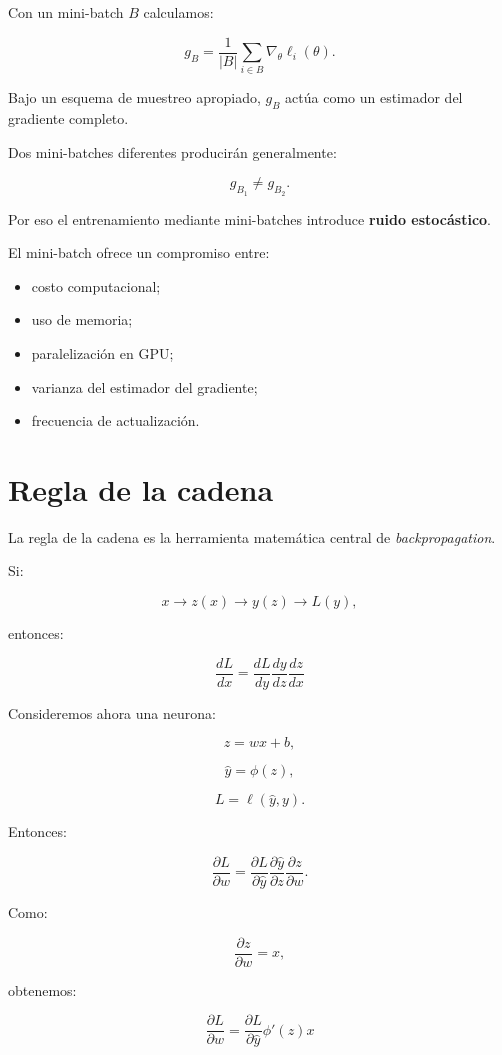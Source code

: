 \documentclass[
  letterpaper,
  DIV=11,
  numbers=noendperiod]{scrartcl}
\providecommand{\tightlist}{%
  \setlength{\itemsep}{0pt}\setlength{\parskip}{0pt}}
\begin{document}
Con un mini-batch \(B\) calculamos:

\[
g_B
=
\frac1{|B|}
\sum_{i\in B}
\nabla_\theta\ell_i(\theta).
\]

Bajo un esquema de muestreo apropiado, \(g_B\) actúa como un estimador
del gradiente completo.

Dos mini-batches diferentes producirán generalmente:

\[
g_{B_1}\neq g_{B_2}.
\]

Por eso el entrenamiento mediante mini-batches introduce \textbf{ruido
estocástico}.

El mini-batch ofrece un compromiso entre:

\begin{itemize}
\tightlist
\item
  costo computacional;
\item
  uso de memoria;
\item
  paralelización en GPU;
\item
  varianza del estimador del gradiente;
\item
  frecuencia de actualización.
\end{itemize}

\section{Regla de la cadena}\label{regla-de-la-cadena}

La regla de la cadena es la herramienta matemática central de
\emph{backpropagation}.

Si:

\[
x
\rightarrow
z(x)
\rightarrow
y(z)
\rightarrow
L(y),
\]

entonces:

\[
\boxed{
\frac{dL}{dx}
=
\frac{dL}{dy}
\frac{dy}{dz}
\frac{dz}{dx}
}
\]

Consideremos ahora una neurona:

\[
z=wx+b,
\]

\[
\hat y=\phi(z),
\]

\[
L=\ell(\hat y,y).
\]

Entonces:

\[
\frac{\partial L}{\partial w}
=
\frac{\partial L}{\partial\hat y}
\frac{\partial\hat y}{\partial z}
\frac{\partial z}{\partial w}.
\]

Como:

\[
\frac{\partial z}{\partial w}=x,
\]

obtenemos:

\[
\boxed{
\frac{\partial L}{\partial w}
=
\frac{\partial L}{\partial\hat y}
\phi'(z)x
}
\]
\end{document}
